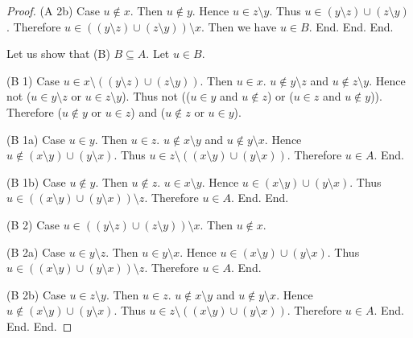 \documentclass[../../set-theory.ftl.tex]{subfiles}
\begin{document}
\begin{forthel}
\begin{proof}
          (A 2b) Case $u \notin x$.
            Then $u \notin y$.
            Hence $u \in z \setminus y$.
            Thus $u \in (y \setminus z) \cup (z \setminus y)$.
            Therefore $u \in ((y \setminus z) \cup (z \setminus y)) \setminus x$.
            Then we have $u \in B$.
          End.
        End.
      End.

      Let us show that (B) $B \subseteq A$.
        Let $u \in B$.

        (B 1) Case $u \in x \setminus ((y \setminus z) \cup (z \setminus y))$.
          Then $u \in x$.
          $u \notin y \setminus z$ and $u \notin z \setminus y$.
          Hence not ($u \in y \setminus z$ or $u \in z \setminus y$).
          Thus not (($u \in y$ and $u \notin z$) or ($u \in z$ and
          $u \notin y$)).
          Therefore ($u \notin y$ or $u \in z$) and ($u \notin z$ or $u \in y$).

          (B 1a) Case $u \in y$.
            Then $u \in z$.
            $u \notin x \setminus y$ and $u \notin y \setminus x$.
            Hence $u \notin (x \setminus y) \cup (y \setminus x)$.
            Thus $u \in z \setminus ((x \setminus y) \cup (y \setminus x))$.
            Therefore $u \in A$.
          End.

          (B 1b) Case $u \notin y$.
            Then $u \notin z$.
            $u \in x \setminus y$.
            Hence $u \in (x \setminus y) \cup (y \setminus x)$.
            Thus $u \in ((x \setminus y) \cup (y \setminus x)) \setminus z$.
            Therefore $u \in A$.
          End.
        End.

        (B 2) Case $u \in ((y \setminus z) \cup (z \setminus y)) \setminus x$.
          Then $u \notin x$.

          (B 2a) Case $u \in y \setminus z$.
            Then $u \in y \setminus x$.
            Hence $u \in (x \setminus y) \cup (y \setminus x)$.
            Thus $u \in ((x \setminus y) \cup (y \setminus x)) \setminus z$.
            Therefore $u \in A$.
          End.

          (B 2b) Case $u \in z \setminus y$.
            Then $u \in z$.
            $u \notin x \setminus y$ and $u \notin y \setminus x$.
            Hence $u \notin (x \setminus y) \cup (y \setminus x)$.
            Thus $u \in z \setminus ((x \setminus y) \cup (y \setminus x))$.
            Therefore $u \in A$.
          End.
        End.
      End.
    \end{proof}
  \end{forthel}
\end{document}
